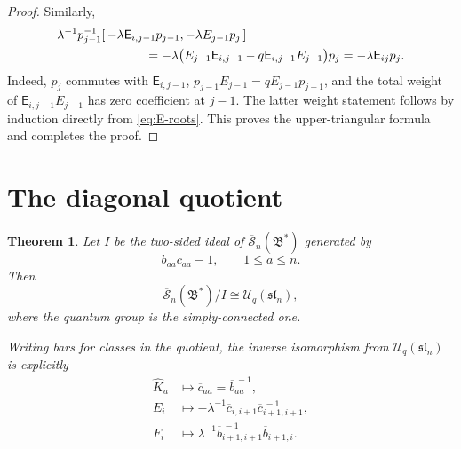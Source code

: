 \documentclass[11pt]{amsart}
\newtheorem{theorem}{Theorem}[section]
\theoremstyle{remark}
\newcommand{\UU}{\mathcal U_q}
\newcommand{\rSk}{\overline{\mathscr S}_n}
\newcommand{\Bstar}{\mathfrak B^{*}}
\newcommand{\slie}{\mathfrak{sl}_n}
\begin{document}
\begin{proof}
Similarly,
\[
 \begin{split}
 &\lambda^{-1}p_{j-1}^{-1}
   [\,-\lambda\mathsf E_{i,j-1}p_{j-1},
      -\lambda E_{j-1}p_j\,]\\
 &\hspace{25mm}
 =-\lambda
   \bigl(E_{j-1}\mathsf E_{i,j-1}
            -q\mathsf E_{i,j-1}E_{j-1}\bigr)p_j
 =-\lambda\mathsf E_{ij}p_j.
 \end{split}
\]
Indeed, $p_j$ commutes with $\mathsf E_{i,j-1}$,
$p_{j-1}E_{j-1}=qE_{j-1}p_{j-1}$, and the total weight of
$\mathsf E_{i,j-1}E_{j-1}$ has zero coefficient at $j-1$.
The latter weight statement follows by induction directly from
\eqref{eq:E-roots}.  This proves the upper-triangular formula and
completes the proof.
\end{proof}

\section{The diagonal quotient}

\begin{theorem}\label{thm:quotient}
Let $I$ be the two-sided ideal of $\rSk(\Bstar)$ generated by
\[
 b_{aa}c_{aa}-1,\qquad 1\leq a\leq n.
\]
Then
\[
 \rSk(\Bstar)/I\cong\UU(\slie),
\]
where the quantum group is the simply-connected one.

Writing bars for classes in the quotient, the inverse
isomorphism from $\UU(\slie)$ is explicitly
\begin{align}
 \widehat K_a
   &\longmapsto \overline c_{aa}
      =\overline b_{aa}^{\, -1},
 \label{eq:quotient-torus}\\
 E_i
   &\longmapsto
       -\lambda^{-1}\overline c_{i,i+1}
                         \overline c_{i+1,i+1}^{\, -1},
 \label{eq:quotient-E}\\
 F_i
   &\longmapsto
       \lambda^{-1}\overline b_{i+1,i+1}^{\, -1}
                        \overline b_{i+1,i}.
 \label{eq:quotient-F}
\end{align}
\end{theorem}
\end{document}
